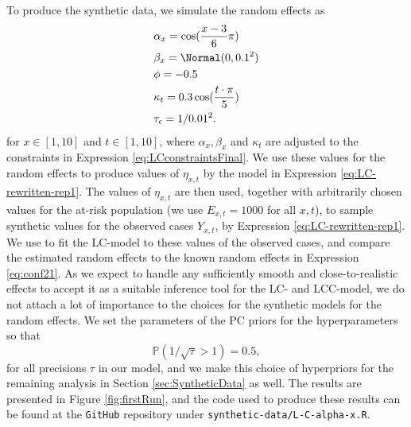 \newpar To produce the synthetic data, we simulate the random effects as
\begin{equation}
    \begin{aligned}
    &\alpha_x = \cos(\frac{x-3}{6}\pi)\\
    &\beta_x = \Normal(0,0.1^2)\\
    &\phi = -0.5\\
    &\kappa_t = 0.3\cos(\frac{t\cdot \pi}{5})\\
    &\tau_{\epsilon} = 1/0.01^2.
    \end{aligned}
    \label{eq:conf21}
\end{equation}
for $x\in [1,10]$ and $t \in [1,10]$, where $\alpha_x, \beta_x$ and $\kappa_t$ are adjusted to the constraints in Expression \ref{eq:LCconstraintsFinal}. We use these values for the random effects to produce values of $\eta_{x,t}$ by the model in Expression \ref{eq:LC-rewritten-rep1}. The values of $\eta_{x,t}$ are then used, together with arbitrarily chosen values for the at-risk population (we use $E_{x,t} = 1000$ for all $x,t$), to sample synthetic values for the observed cases $Y_{x,t}$, by Expression \ref{eq:LC-rewritten-rep1}. We use \inlabru to fit the LC-model to these values of the observed cases, and compare the estimated random effects to the known random effects in Expression \ref{eq:conf21}. As we expect \inlabru to handle any sufficiently smooth and close-to-realistic effects to accept it as a suitable inference tool for the LC- and LCC-model, we do not attach a lot of importance to the choices for the synthetic models for the random effects. We set the parameters of the PC priors for the hyperparameters so that
\begin{equation}
    \mathbb{P}(1/\sqrt{\tau} > 1) = 0.5,
\end{equation}
for all precisions $\tau$ in our model, and we make this choice of hyperpriors for the remaining analysis in Section \ref{sec:SyntheticData} as well. The results are presented in Figure \ref{fig:firstRun}, and the code used to produce these results can be found at the \texttt{GitHub} repository under \texttt{synthetic-data/L-C-alpha-x.R}.


